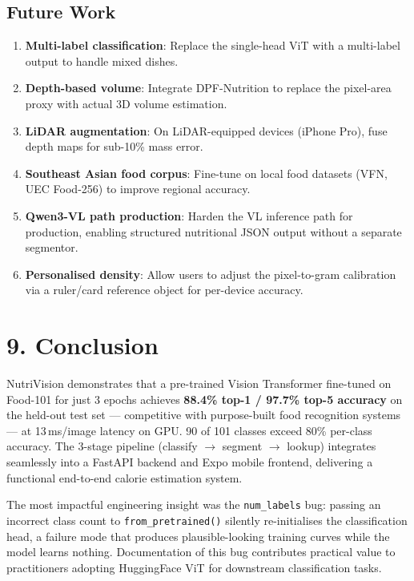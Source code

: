 \documentclass[fleqn,10pt]{SelfArx}
\begin{document}
\subsection{Future Work}

\begin{enumerate}[noitemsep]
    \item \textbf{Multi-label classification}: Replace the single-head ViT with a multi-label output to handle mixed dishes.
    \item \textbf{Depth-based volume}: Integrate DPF-Nutrition \cite{han2023dpf} to replace the pixel-area proxy with actual 3D volume estimation.
    \item \textbf{LiDAR augmentation}: On LiDAR-equipped devices (iPhone Pro), fuse depth maps for sub-10\% mass error.
    \item \textbf{Southeast Asian food corpus}: Fine-tune on local food datasets (VFN, UEC Food-256) to improve regional accuracy.
    \item \textbf{Qwen3-VL path production}: Harden the VL inference path for production, enabling structured nutritional JSON output without a separate segmentor.
    \item \textbf{Personalised density}: Allow users to adjust the pixel-to-gram calibration via a ruler/card reference object for per-device accuracy.
\end{enumerate}

\section{9. Conclusion}

NutriVision demonstrates that a pre-trained Vision Transformer fine-tuned on Food-101 for just 3 epochs achieves \textbf{88.4\% top-1 / 97.7\% top-5 accuracy} on the held-out test set — competitive with purpose-built food recognition systems — at 13\,ms/image latency on GPU. 90 of 101 classes exceed 80\% per-class accuracy. The 3-stage pipeline (classify $\rightarrow$ segment $\rightarrow$ lookup) integrates seamlessly into a FastAPI backend and Expo mobile frontend, delivering a functional end-to-end calorie estimation system.

The most impactful engineering insight was the \texttt{num\_labels} bug: passing an incorrect class count to \texttt{from\_pretrained()} silently re-initialises the classification head, a failure mode that produces plausible-looking training curves while the model learns nothing. Documentation of this bug contributes practical value to practitioners adopting HuggingFace ViT for downstream classification tasks.
\end{document}
